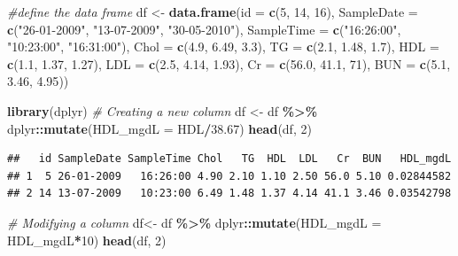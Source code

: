 \documentclass[
]{book}
\newenvironment{Shaded}{\begin{snugshade}}{\end{snugshade}}
\newcommand{\AttributeTok}[1]{\textcolor[rgb]{0.13,0.29,0.53}{#1}}
\newcommand{\CommentTok}[1]{\textcolor[rgb]{0.56,0.35,0.01}{\textit{#1}}}
\newcommand{\DecValTok}[1]{\textcolor[rgb]{0.00,0.00,0.81}{#1}}
\newcommand{\FloatTok}[1]{\textcolor[rgb]{0.00,0.00,0.81}{#1}}
\newcommand{\FunctionTok}[1]{\textcolor[rgb]{0.13,0.29,0.53}{\textbf{#1}}}
\newcommand{\NormalTok}[1]{#1}
\newcommand{\OtherTok}[1]{\textcolor[rgb]{0.56,0.35,0.01}{#1}}
\newcommand{\SpecialCharTok}[1]{\textcolor[rgb]{0.81,0.36,0.00}{\textbf{#1}}}
\newcommand{\StringTok}[1]{\textcolor[rgb]{0.31,0.60,0.02}{#1}}
\begin{document}
\begin{Shaded}
\begin{Highlighting}[]
\CommentTok{\#define the data frame}
\NormalTok{df }\OtherTok{\textless{}{-}} \FunctionTok{data.frame}\NormalTok{(}\AttributeTok{id =} \FunctionTok{c}\NormalTok{(}\DecValTok{5}\NormalTok{, }\DecValTok{14}\NormalTok{, }\DecValTok{16}\NormalTok{), }
        \AttributeTok{SampleDate =} \FunctionTok{c}\NormalTok{(}\StringTok{"26{-}01{-}2009"}\NormalTok{, }\StringTok{"13{-}07{-}2009"}\NormalTok{, }\StringTok{"30{-}05{-}2010"}\NormalTok{), }
        \AttributeTok{SampleTime =} \FunctionTok{c}\NormalTok{(}\StringTok{"16:26:00"}\NormalTok{, }\StringTok{"10:23:00"}\NormalTok{, }\StringTok{"16:31:00"}\NormalTok{), }
        \AttributeTok{Chol =} \FunctionTok{c}\NormalTok{(}\FloatTok{4.9}\NormalTok{, }\FloatTok{6.49}\NormalTok{, }\FloatTok{3.3}\NormalTok{), }
        \AttributeTok{TG =} \FunctionTok{c}\NormalTok{(}\FloatTok{2.1}\NormalTok{, }\FloatTok{1.48}\NormalTok{, }\FloatTok{1.7}\NormalTok{), }
        \AttributeTok{HDL =} \FunctionTok{c}\NormalTok{(}\FloatTok{1.1}\NormalTok{, }\FloatTok{1.37}\NormalTok{, }\FloatTok{1.27}\NormalTok{), }
        \AttributeTok{LDL =} \FunctionTok{c}\NormalTok{(}\FloatTok{2.5}\NormalTok{, }\FloatTok{4.14}\NormalTok{, }\FloatTok{1.93}\NormalTok{),  }
        \AttributeTok{Cr =} \FunctionTok{c}\NormalTok{(}\FloatTok{56.0}\NormalTok{, }\FloatTok{41.1}\NormalTok{, }\DecValTok{71}\NormalTok{),}
        \AttributeTok{BUN =} \FunctionTok{c}\NormalTok{(}\FloatTok{5.1}\NormalTok{, }\FloatTok{3.46}\NormalTok{, }\FloatTok{4.95}\NormalTok{))}

\FunctionTok{library}\NormalTok{(dplyr)}
\CommentTok{\# Creating a new column}
\NormalTok{df }\OtherTok{\textless{}{-}}\NormalTok{ df }\SpecialCharTok{\%\textgreater{}\%}\NormalTok{ dplyr}\SpecialCharTok{::}\FunctionTok{mutate}\NormalTok{(}\AttributeTok{HDL\_mgdL =}\NormalTok{ HDL}\SpecialCharTok{/}\FloatTok{38.67}\NormalTok{)}
\FunctionTok{head}\NormalTok{(df, }\DecValTok{2}\NormalTok{)}
\end{Highlighting}
\end{Shaded}

\begin{verbatim}
##   id SampleDate SampleTime Chol   TG  HDL  LDL   Cr  BUN   HDL_mgdL
## 1  5 26-01-2009   16:26:00 4.90 2.10 1.10 2.50 56.0 5.10 0.02844582
## 2 14 13-07-2009   10:23:00 6.49 1.48 1.37 4.14 41.1 3.46 0.03542798
\end{verbatim}

\begin{Shaded}
\begin{Highlighting}[]
\CommentTok{\# Modifying a column}
\NormalTok{df}\OtherTok{\textless{}{-}}\NormalTok{ df }\SpecialCharTok{\%\textgreater{}\%}\NormalTok{ dplyr}\SpecialCharTok{::}\FunctionTok{mutate}\NormalTok{(}\AttributeTok{HDL\_mgdL =}\NormalTok{ HDL\_mgdL}\SpecialCharTok{*}\DecValTok{10}\NormalTok{)}
\FunctionTok{head}\NormalTok{(df, }\DecValTok{2}\NormalTok{)}
\end{Highlighting}
\end{Shaded}
\end{document}
